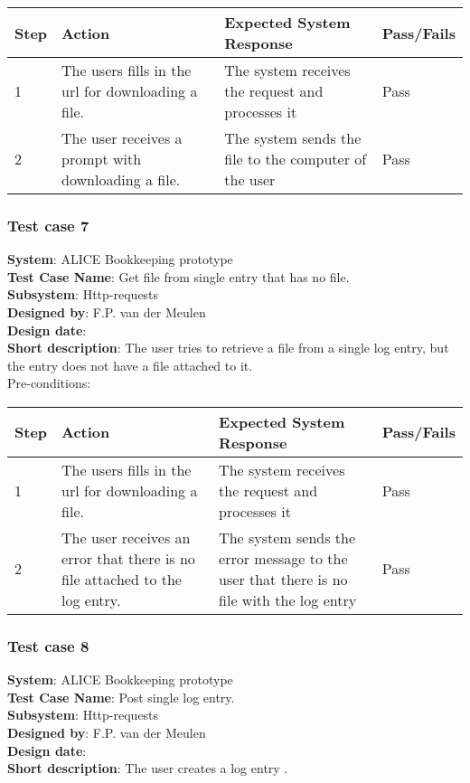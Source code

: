 \begin{longtable}{ | p{0.8cm} | p{4.5cm} | p{6cm} | p{1.5cm} |}
\hline
Step & Action & Expected System Response & Pass/Fails  \\ \hline
1 & The users fills in the url for downloading a file. & The system receives the request and processes it & Pass \\ \hline
2 & The user receives a prompt with downloading a file. & The system sends the file to the computer of the user & Pass
\end{longtable}
\subsubsection{Test case 7}
\textbf{System}:  ALICE Bookkeeping prototype \\
\textbf{Test Case Name}:  Get file from single entry that has no file. \\
\textbf{Subsystem}:  Http-requests \\
\textbf{Designed by}:  F.P. van der Meulen\\
\textbf{Design date}:  \\
\textbf{Short description}: The user tries to retrieve a file from a single log entry, but the entry does not have a file attached to it. \\

Pre-conditions: \\

\begin{longtable}{ | p{0.8cm} | p{4.5cm} | p{6cm} | p{1.5cm} |}
\hline
Step & Action & Expected System Response & Pass/Fails  \\ \hline
1 & The users fills in the url for downloading a file. & The system receives the request and processes it & Pass \\ \hline
2 & The user receives an error that there is no file attached to the log entry. & The system sends the error message to the user that there is no file with the log entry & Pass
\end{longtable}

\subsubsection{Test case 8}
\textbf{System}:  ALICE Bookkeeping prototype \\
\textbf{Test Case Name}:  Post single log entry. \\
\textbf{Subsystem}:  Http-requests \\
\textbf{Designed by}:  F.P. van der Meulen\\
\textbf{Design date}:  \\
\textbf{Short description}: The user creates a log entry . \\

